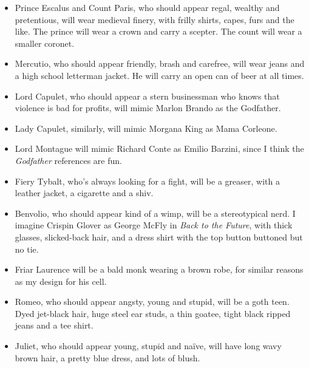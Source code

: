 \begin{itemize}
\item Prince Escalus and Count Paris, who should appear regal, wealthy and pretentious,
  will wear medieval finery, with frilly shirts, capes, furs and the like. The prince will
  wear a crown and carry a scepter. The count will wear a smaller coronet.
\item Mercutio, who should appear friendly, brash and carefree, will wear jeans and a high
  school letterman jacket. He will carry an open can of beer at all times.
\item Lord Capulet, who should appear a stern businessman who knows that violence is bad
  for profits, will mimic Marlon Brando as the Godfather.
\item Lady Capulet, similarly, will mimic Morgana King as Mama Corleone.
\item Lord Montague will mimic Richard Conte as Emilio Barzini, since I think the
  \textit{Godfather} references are fun.
\item Fiery Tybalt, who's always looking for a fight, will be a greaser, with a leather
  jacket, a cigarette and a shiv.
\item Benvolio, who should appear kind of a wimp, will be a stereotypical nerd. I imagine
  Crispin Glover as George McFly in \textit{Back to the Future}, with thick glasses,
  slicked-back hair, and a dress shirt with the top button buttoned but no tie.
\item Friar Laurence will be a bald monk wearing a brown robe, for similar reasons as my
  design for his cell.
\item Romeo, who should appear angsty, young and stupid, will be a goth teen. Dyed
  jet-black hair, huge steel ear studs, a thin goatee, tight black ripped jeans and a tee
  shirt.
\item Juliet, who should appear young, stupid and naïve, will have long wavy brown hair, a
  pretty blue dress, and lots of blush.
\end{itemize}
